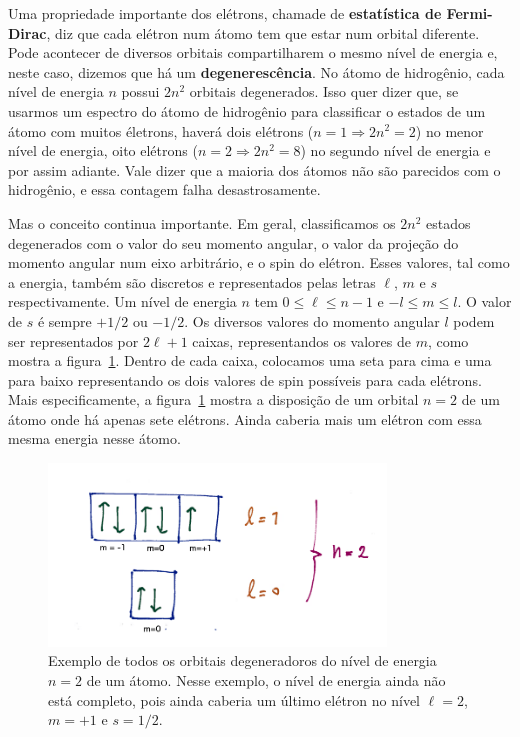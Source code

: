 \documentclass{article}
\begin{document}
Uma propriedade importante dos el\'etrons, chamade de \textbf{estat\'istica de Fermi-Dirac}, diz que cada el\'etron num \'atomo tem que estar num orbital diferente. Pode acontecer de diversos orbitais compartilharem o mesmo n\'ivel de energia e, neste caso, dizemos que h\'a um \textbf{degeneresc\^encia}. No \'atomo de hidrog\^enio, cada n\'ivel de energia $n$ possui $2n^2$ orbitais degenerados. Isso quer dizer que, se usarmos um espectro do \'atomo de hidrog\^enio para classificar o estados de um \'atomo com muitos \'eletrons, haver\'a dois el\'etrons ($n=1\Rightarrow 2n^2= 2$) no menor n\'ivel de energia, oito el\'etrons ($n=2\Rightarrow 2n^2=8$) no segundo n\'ivel de energia e por assim adiante. Vale dizer que a maioria dos \'atomos n\~ao s\~ao parecidos com o hidrog\^enio, e essa contagem falha desastrosamente.

Mas o conceito continua importante. Em geral, classificamos os $2n^2$ estados degenerados com o valor do seu momento angular, o valor da proje\c c\~ao do momento angular num eixo arbitr\'ario, e o spin do el\'etron. Esses valores, tal como a energia, tamb\'em s\~ao discretos e representados pelas letras $\ell$, $m$ e $s$ respectivamente. Um n\'ivel de energia $n$ tem $0  \leq \ell \leq n-1$ e $-l \leq m \leq l$. O valor de $s$ \'e sempre $+1/2$ ou $-1/2$. Os diversos valores do momento angular $l$ podem ser representados por $2\ell +1$ caixas, representandos os valores de $m$, como mostra a figura~\ref{fig:manyelectrons}. Dentro de cada caixa, colocamos uma seta para cima e uma para baixo representando os dois valores de spin poss\'iveis para cada el\'etrons. Mais especificamente, a figura~\ref{fig:manyelectrons} mostra a disposi\c c\~ao de um orbital $n=2$ de um \'atomo onde h\'a apenas sete el\'etrons. Ainda caberia mais um el\'etron com essa mesma energia nesse \'atomo.

\begin{figure}[ht]
\begin{center}
\includegraphics[width=0.8\textwidth]{orbital.png}
\caption{\label{fig:manyelectrons}Exemplo de todos os orbitais degeneradoros do n\'ivel de energia $n=2$ de um \'atomo. Nesse exemplo, o n\'ivel de energia ainda n\~ao est\'a completo, pois ainda caberia um \'ultimo el\'etron no n\'ivel $\ell=2$, $m=+1$ e $s=1/2$.}
\end{center}
\end{figure}
\end{document}

